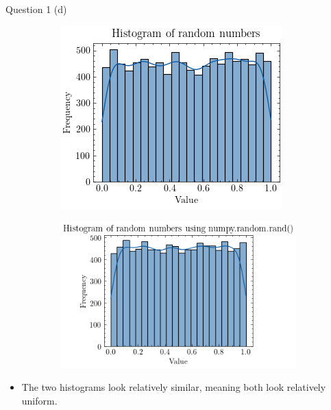 \documentclass[compress,12pt]{beamer}
\begin{document}
\begin{frame}{Question 1 (d)}
      \begin{figure}
            \centering
            \begin{subfigure}{0.45\textwidth}
                  \centering
                  \includegraphics[scale=0.5]{imgs/1a.png}
            \end{subfigure}
            \begin{subfigure}{0.45\textwidth}
                  \centering
                  \includegraphics[scale=0.5]{imgs/1d.png}
            \end{subfigure}
      \end{figure}

      \begin{itemize}
            \item The two histograms look relatively similar, meaning both look relatively uniform.
      \end{itemize}
\end{frame}
\end{document}
